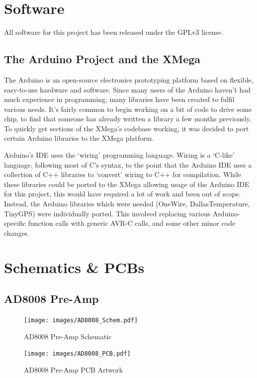 \documentclass[a4paper,12pt]{article}
\begin{document}
\begin{appendices}
\newpage
\section{Software}
All software for this project has been released under the GPLv3 license. 

\subsection{The Arduino Project and the XMega}
\label{arduino}
The Arduino is an open-source electronics prototyping platform based on flexible, easy-to-use hardware and software.
Since many users of the Arduino haven't had much experience in programming, many libraries have been created to fulfil various needs. It's fairly common to begin working on a bit of code to drive some chip, to find that someone has already written a library a few months previously. To quickly get sections of the XMega's codebase working, it was decided to port certain Arduino libraries to the XMega platform. 

Arduino's IDE uses the `wiring' programming language. Wiring is a `C-like' language, following most of C's syntax, to the point that the Arduino IDE uses a collection of C++ libraries to `convert' wiring to C++ for compilation. While these libraries could be ported to the XMega allowing usage of the Arduino IDE for this project, this would have required a lot of work and been out of scope. Instead, the Arduino libraries which were needed (OneWire, DallasTemperature, TinyGPS) were individually ported. This involved replacing various Arduino-specific function calls with generic AVR-C calls, and some other minor code changes. 

\newpage
\section{Schematics \& PCBs}
\subsection{AD8008 Pre-Amp}
\label{ad8008_preamp}
\begin{figure}[h!]
\begin{center}
\texttt{[image: images/AD8008\_Schem.pdf]}
\caption{AD8008 Pre-Amp Schematic}
\label{ad8008_schem}
\end{center}
\end{figure}
\begin{figure}[h!]
\begin{center}
\texttt{[image: images/AD8008\_PCB.pdf]}
\caption{AD8008 Pre-Amp PCB Artwork}
\label{ad8008_PCB}
\end{center}
\end{figure}
\newpage

\end{appendices}
\end{document}
